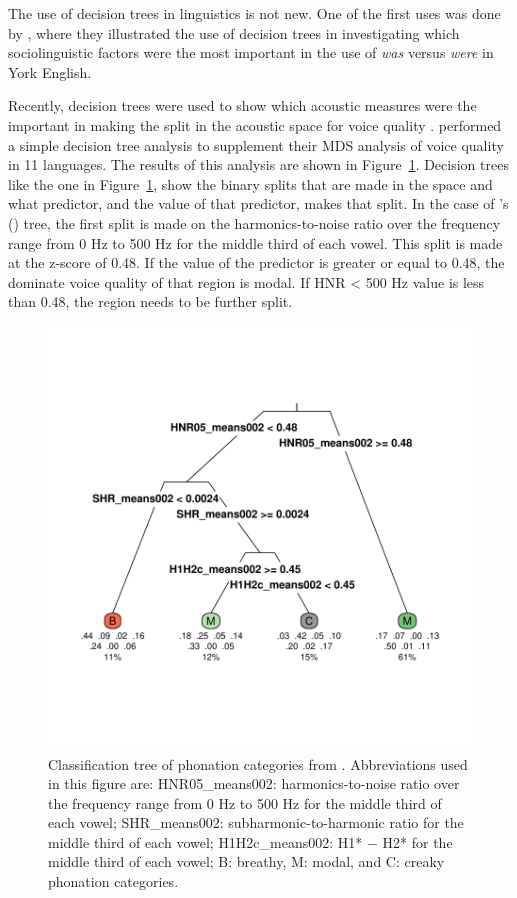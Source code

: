 The use of decision trees in linguistics is not new. One of the first uses was done by \citet{tagliamonteModelsForestsTrees2012}, where they illustrated the use of decision trees in investigating which sociolinguistic factors were the most important in the use of \textit{was} versus \textit{were} in York English. 

Recently, decision trees were used to show which acoustic measures were the important in making the split in the acoustic space for voice quality \citep{keatingCrosslanguageAcousticSpace2023}. \citeauthor{keatingCrosslanguageAcousticSpace2023} performed a simple decision tree analysis to supplement their MDS analysis of voice quality in 11 languages. The results of this analysis are shown in Figure~\ref{fig:keating_tree}. Decision trees like the one in Figure~\ref{fig:keating_tree}, show the binary splits that are made in the space and what predictor, and the value of that predictor, makes that split. In the case of \citeauthor{keatingCrosslanguageAcousticSpace2023}'s (\citeyear{keatingCrosslanguageAcousticSpace2023}) tree, the first split is made on the harmonics-to-noise ratio over the frequency range from 0 Hz to 500 Hz for the middle third of each vowel. This split is made at the z-score of 0.48. If the value of the predictor is greater or equal to 0.48, the dominate voice quality of that region is modal. If HNR < 500 Hz value is less than 0.48, the region needs to be further split. 

\begin{figure}[!ht]
    \centering
    \includegraphics[width = 0.9\linewidth]{images/keating_tree.pdf}
    \caption{Classification tree of phonation categories from \citet{keatingCrosslanguageAcousticSpace2023}. Abbreviations used in this figure are: {HNR05_means002}: harmonics-to-noise ratio over the frequency range from 0 Hz to 500 Hz for the middle third of each vowel; {SHR_means002}: subharmonic-to-harmonic ratio for the middle third of each vowel; {H1H2c_means002}: H1* − H2* for the middle third of each vowel; B: breathy, M: modal, and C: creaky phonation categories.}
    \label{fig:keating_tree}
\end{figure}

